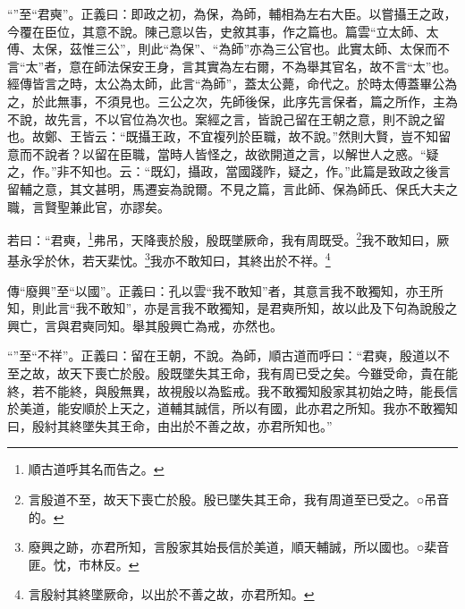 {\noindent\shu{}\fzkt “”至“君奭”。正義曰：即政之初，為保，為師，輔相為左右大臣。以嘗攝王之政，今覆在臣位，其意不說。陳己意以告，史敘其事，作之篇也。篇雲“立太師、太傅、太保，茲惟三公”，則此“為保”、“為師”亦為三公官也。此實太師、太保而不言“太”者，意在師法保安王身，言其實為左右爾，不為舉其官名，故不言“太”也。經傳皆言之時，太公為太師，此言“為師”，蓋太公薨，命代之。於時太傅蓋畢公為之，於此無事，不須見也。三公之次，先師後保，此序先言保者，篇之所作，主為不說，故先言，不以官位為次也。案經之言，皆說己留在王朝之意，則不說之留也。故鄭、王皆云：“既攝王政，不宜複列於臣職，故不說。”然則大賢，豈不知留意而不說者？以留在臣職，當時人皆怪之，故欲開道之言，以解世人之惑。“疑之，作。”非不知也。云：“既幻，攝政，當國踐阼，疑之，作。”此篇是致政之後言留輔之意，其文甚明，馬遷妄為說爾。不見之篇，言此師、保為師氏、保氏大夫之職，言賢聖兼此官，亦謬矣。 \par}

若曰：“君奭，\footnote{順古道呼其名而告之。}弗吊，天降喪於殷，殷既墜厥命，我有周既受。\footnote{言殷道不至，故天下喪亡於殷。殷已墜失其王命，我有周道至已受之。○吊音的。}我不敢知曰，厥基永孚於休，若天棐忱。\footnote{廢興之跡，亦君所知，言殷家其始長信於美道，順天輔誠，所以國也。○棐音匪。忱，市林反。}我亦不敢知曰，其終出於不祥。\footnote{言殷紂其終墜厥命，以出於不善之故，亦君所知。}


{\noindent\zhuan{}\fzbyks 傳“廢興”至“以國”。正義曰：孔以雲“我不敢知”者，其意言我不敢獨知，亦王所知，則此言“我不敢知”，亦是言我不敢獨知，是君奭所知，故以此及下句為說殷之興亡，言與君奭同知。舉其殷興亡為戒，亦然也。 \par}

{\noindent\shu{}\fzkt “”至“不祥”。正義曰：留在王朝，不說。為師，順古道而呼曰：“君奭，殷道以不至之故，故天下喪亡於殷。殷既墜失其王命，我有周已受之矣。今雖受命，貴在能終，若不能終，與殷無異，故視殷以為監戒。我不敢獨知殷家其初始之時，能長信於美道，能安順於上天之，道輔其誠信，所以有國，此亦君之所知。我亦不敢獨知曰，殷紂其終墜失其王命，由出於不善之故，亦君所知也。” \par}

